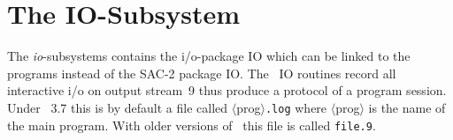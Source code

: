 \section{The IO-Subsystem}

The {\it io}-subsystems contains the i/o-package IO which can be
linked to the programs instead of the SAC-2 package IO.
The \redux\  IO routines record all interactive i/o on
output stream~9  thus produce a protocol of a program session.
Under \ALDES\ 3.7 this is by default a file called 
$\langle$prog$\rangle${\tt .log} where $\langle$prog$\rangle$ is the name
of the main program.
With older versions of \ALDES\ this file is called {\tt file.9}.

